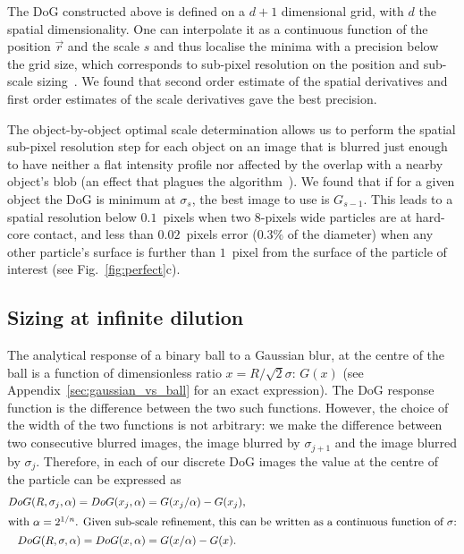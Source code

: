 \documentclass[8.5pt,twoside,twocolumn]{article}
\begin{document}
The DoG constructed above is defined on a $d+1$ dimensional grid, with $d$ the spatial dimensionality. One can interpolate it as a continuous function of the position $\vec{r}$ and the scale $s$ and thus localise the minima with a precision below the grid size, which corresponds to sub-pixel resolution on the position and sub-scale sizing~\citep{Lowe2004}. We found that second order estimate of the spatial derivatives and first order estimates of the scale derivatives gave the best precision.

The object-by-object optimal scale determination allows us to perform the spatial sub-pixel resolution step for each object on an image that is blurred just enough to have neither a flat intensity profile nor affected by the overlap with a nearby object's blob (an effect that plagues the \citet{Crocker1996} algorithm~\cite{Jenkins2008}). We found that if for a given object the DoG is minimum at $\sigma_s$, the best image to use is $G_{s-1}$. This leads to a spatial resolution below $0.1$~pixels when two $8$-pixels wide particles are at hard-core contact, and less than $0.02$~pixels error ($0.3\%$ of the diameter) when any other particle's surface is further than $1$~pixel from the surface of the particle of interest (see Fig.~\ref{fig:perfect}c).

\subsection{Sizing at infinite dilution}
\label{sec:dilute}
The analytical response of a binary ball to a Gaussian blur, at the centre of the ball is a function of dimensionless ratio $x=R/\sqrt{2}\sigma$: $G(x)$ (see Appendix~\ref{sec:gaussian_vs_ball} for an exact expression). The DoG response function is the difference between the two such functions. However, the choice of the width of the two functions is not arbitrary: we make the difference between two consecutive blurred images, the image blurred by $\sigma_{j+1}$ and the image blurred by $\sigma_j$. Therefore, in each of our discrete DoG images the value at the centre of the particle can be expressed as
\begin{align}
DoG(R,\sigma_j, \alpha) = DoG(x_j, \alpha) &= G(x_j/\alpha) - G(x_j),\\
\intertext{with $\alpha=2^{1/n}$. Given sub-scale refinement, this can be written as a continuous function of $\sigma$:}
DoG(R,\sigma, \alpha) = DoG(x, \alpha) &= G(x/\alpha) - G(x).
\end{align}
\end{document}
